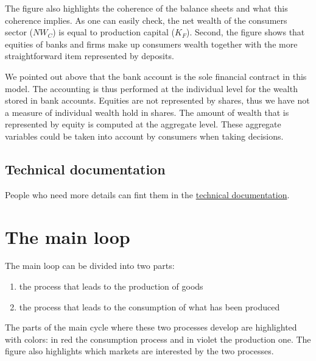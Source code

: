 \documentclass{book}
\newcommand{\doclocation}{file:///Users/giulioni/Documents/workspace/gabriele/docs}
\begin{document}
The figure also highlights the coherence of the balance sheets and what this coherence implies. As one can easily check, the net wealth of the consumers sector ($NW_C$) is equal to production capital ($K_F$). Second, the figure shows that equities of banks and firms make up consumers wealth together with the more straightforward item represented by deposits. 

We pointed out above that the bank account is the sole financial contract in this model. The accounting is thus performed at the individual level for the wealth stored in bank accounts. Equities are not represented by shares, thus we have not a measure of individual wealth hold in shares. The amount of wealth that is represented by equity is computed at the aggregate level. These aggregate variables could be taken into account by consumers when taking decisions.   

\subsection{Technical documentation}

People who need more details can fint them in the \href{\doclocation/index_initialization.html}{technical documentation}.

\newpage
\section{The main loop}\label{sec:mainloop}
The main loop can be divided into two parts:
\begin{enumerate}
	\item the process that leads to the production of goods
	\item the process that leads to the consumption of what has been produced
\end{enumerate}
The parts of the main cycle where these two processes develop are highlighted with colors: in red the consumption process and in violet the production one. The figure also highlights which markets are interested by the two processes.
\end{document}
